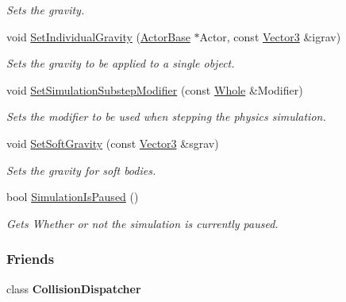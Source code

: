\begin{DoxyCompactItemize}
\begin{DoxyCompactList}\small\item\em Sets the gravity. \item\end{DoxyCompactList}\item 
void \hyperlink{classMezzanine_1_1PhysicsManager_a63f9fe303e30542249d263773ae9dc08}{SetIndividualGravity} (\hyperlink{classMezzanine_1_1ActorBase}{ActorBase} $\ast$Actor, const \hyperlink{classMezzanine_1_1Vector3}{Vector3} \&igrav)
\begin{DoxyCompactList}\small\item\em Sets the gravity to be applied to a single object. \item\end{DoxyCompactList}\item 
void \hyperlink{classMezzanine_1_1PhysicsManager_acbe6ef0e6554702a005c152079bb40c0}{SetSimulationSubstepModifier} (const \hyperlink{namespaceMezzanine_adcbb6ce6d1eb4379d109e51171e2e493}{Whole} \&Modifier)
\begin{DoxyCompactList}\small\item\em Sets the modifier to be used when stepping the physics simulation. \item\end{DoxyCompactList}\item 
void \hyperlink{classMezzanine_1_1PhysicsManager_ab7f73d5ea910fc68120d33ee8c491d88}{SetSoftGravity} (const \hyperlink{classMezzanine_1_1Vector3}{Vector3} \&sgrav)
\begin{DoxyCompactList}\small\item\em Sets the gravity for soft bodies. \item\end{DoxyCompactList}\item 
bool \hyperlink{classMezzanine_1_1PhysicsManager_a2124e18b9fd28d1dc3c0da54224154b2}{SimulationIsPaused} ()
\begin{DoxyCompactList}\small\item\em Gets Whether or not the simulation is currently paused. \item\end{DoxyCompactList}\end{DoxyCompactItemize}
\subsubsection*{Friends}
\begin{DoxyCompactItemize}
\item 
\hypertarget{classMezzanine_1_1PhysicsManager_aa4a13416efe17e957deb2cf4dcce3a60}{
class {\bfseries CollisionDispatcher}}
\label{classMezzanine_1_1PhysicsManager_aa4a13416efe17e957deb2cf4dcce3a60}

\end{DoxyCompactItemize}


